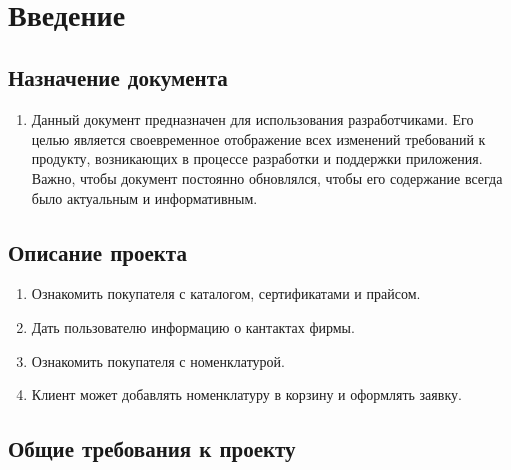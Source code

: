 

\newpage
\tableofcontents
\hspace{0pt}\\
\newpage

\thispagestyle{plain}
\pagestyle{plain}
\hspace{0pt}

\section{Введение}

\subsection{Назначение документа}

\begin{enumerate}[label=\thesubsection.\arabic*, leftmargin=3cm]
    \item Данный документ предназначен для использования разработчиками.
    Его целью является своевременное отображение всех изменений требований к продукту,
    возникающих в процессе разработки и поддержки приложения.
    Важно, чтобы документ постоянно обновлялся,
    чтобы его содержание всегда было актуальным и информативным.
\end{enumerate}

\subsection{Описание проекта}

\begin{enumerate}[label=\thesubsection.\arabic*, leftmargin=3cm]
    \item Ознакомить покупателя с каталогом, сертификатами и прайсом.
    \item Дать пользователю информацию о кантактах фирмы.
    \item Ознакомить покупателя с номенклатурой.
    \item Клиент может добавлять номенклатуру в корзину и оформлять заявку.
\end{enumerate}

\subsection{Общие требования к проекту}

